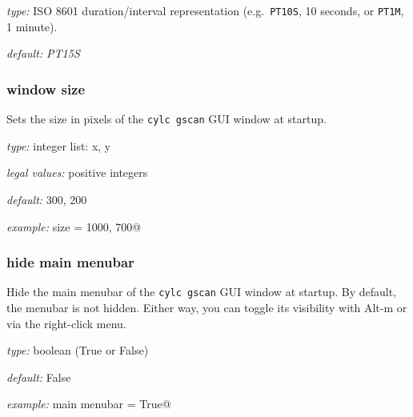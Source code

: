 \begin{myitemize}
\item {\em type:} ISO 8601 duration/interval representation (e.g.\ 
\lstinline=PT10S=, 10 seconds, or \lstinline=PT1M=, 1 minute).
\item {\em default: PT15S}
\end{myitemize}

\subsubsection{window size}

Sets the size in pixels of the \lstinline=cylc gscan= GUI window at startup.

\begin{myitemize}
    \item {\em type:} integer list: x, y
    \item {\em legal values:} positive integers
    \item {\em default:} 300, 200
    \item {\em example:} \lstinline@window size = 1000, 700@
\end{myitemize}

\subsubsection{hide main menubar}

Hide the main menubar of the \lstinline=cylc gscan= GUI window at startup. By
default, the menubar is not hidden. Either way, you can toggle its
visibility with Alt-m or via the right-click menu.

\begin{myitemize}
  \item {\em type:} boolean (True or False)
    \item {\em default:} False
    \item {\em example:} \lstinline@hide main menubar = True@
\end{myitemize}
